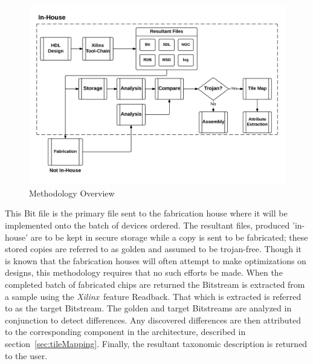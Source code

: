 \documentclass[conference]{IEEEtran}
\newcommand{\Xilinx}{\textit{\gls{Xilinx}}~}
\begin{document}
\begin{figure}
	\centering
	\includegraphics[width=1\linewidth]{../Thesis/Figures/methodologyOverview}
	\caption[Methodology Overview]{Methodology Overview}
	\label{fig:methodologyOverview}
\end{figure}
This Bit file is the primary file sent to the fabrication house where it will be implemented onto the batch of devices ordered.
The resultant files, produced 'in-house' are to be kept in secure storage while a copy is sent to be fabricated; these stored copies are referred to as \gls{golden} and assumed to be trojan-free.
Though it is known that the fabrication houses will often attempt to make optimizations on designs, this methodology requires that no such efforts be made.
When the completed batch of fabricated chips are returned the \gls{Bitstream} is extracted from a sample using the \Xilinx feature \gls{Readback}. 
That which is extracted is referred to as the \gls{target} \gls{Bitstream}.
The \gls{golden} and \gls{target} \gls{Bitstream}s are analyzed in conjunction to detect differences.
Any discovered differences are then attributed to the corresponding component in the architecture, described in section~\ref{sec:tileMapping}.
Finally, the resultant taxonomic description is returned to the user.

\end{document}
